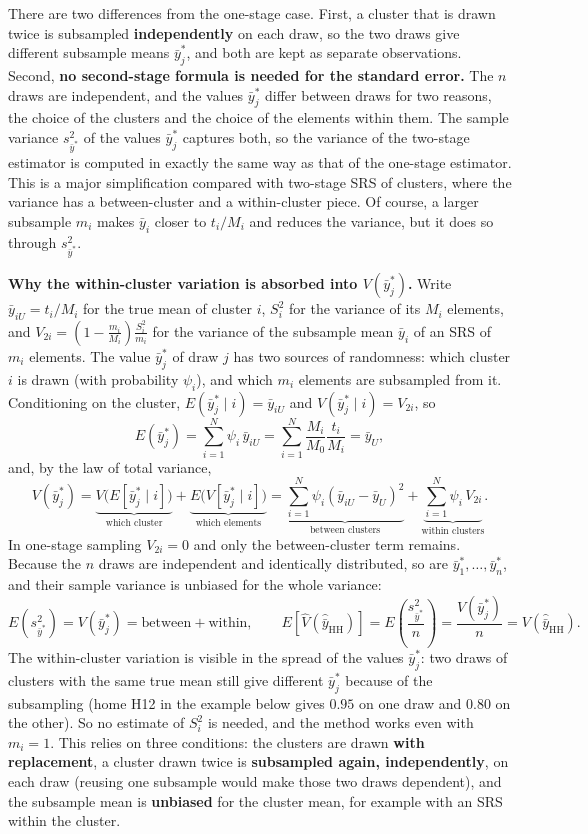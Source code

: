 \documentclass[
  letterpaper,
  DIV=11,
  numbers=noendperiod]{scrreprt}
\renewcommand{\[}{\begin{equation}}
\renewcommand{\]}{\end{equation}}
\begin{document}
There are two differences from the one-stage case. First, a cluster that
is drawn twice is subsampled \textbf{independently} on each draw, so the
two draws give different subsample means \(\bar{y}_j^*\), and both are
kept as separate observations. Second, \textbf{no second-stage formula
is needed for the standard error.} The \(n\) draws are independent, and
the values \(\bar{y}_j^*\) differ between draws for two reasons, the
choice of the clusters and the choice of the elements within them. The
sample variance \(s_{\bar{y}^*}^2\) of the values \(\bar{y}_j^*\)
captures both, so the variance of the two-stage estimator is computed in
exactly the same way as that of the one-stage estimator. This is a major
simplification compared with two-stage SRS of clusters, where the
variance has a between-cluster and a within-cluster piece. Of course, a
larger subsample \(m_i\) makes \(\bar{y}_i\) closer to \(t_i/M_i\) and
reduces the variance, but it does so through \(s_{\bar{y}^*}^2\).

\textbf{Why the within-cluster variation is absorbed into
\(V(\bar{y}_j^*)\).} Write \(\bar{y}_{iU}=t_i/M_i\) for the true mean of
cluster \(i\), \(S_i^2\) for the variance of its \(M_i\) elements, and
\(V_{2i}=\left(1-\frac{m_i}{M_i}\right)\frac{S_i^2}{m_i}\) for the
variance of the subsample mean \(\bar{y}_i\) of an SRS of \(m_i\)
elements. The value \(\bar{y}_j^*\) of draw \(j\) has two sources of
randomness: which cluster \(i\) is drawn (with probability \(\psi_i\)),
and which \(m_i\) elements are subsampled from it. Conditioning on the
cluster, \(E(\bar{y}_j^*\mid i)=\bar{y}_{iU}\) and
\(V(\bar{y}_j^*\mid i)=V_{2i}\), so \[
E(\bar{y}_j^*)=\sum_{i=1}^N\psi_i\,\bar{y}_{iU}=\sum_{i=1}^N\frac{M_i}{M_0}\frac{t_i}{M_i}=\bar{y}_U,
\] and, by the law of total variance, \[
V(\bar{y}_j^*)=\underbrace{V\big(E[\bar{y}_j^*\mid i]\big)}_{\text{which cluster}}
+\underbrace{E\big(V[\bar{y}_j^*\mid i]\big)}_{\text{which elements}}
=\underbrace{\sum_{i=1}^N\psi_i\left(\bar{y}_{iU}-\bar{y}_U\right)^2}_{\text{between clusters}}
+\underbrace{\sum_{i=1}^N\psi_i\,V_{2i}}_{\text{within clusters}} .
\] In one-stage sampling \(V_{2i}=0\) and only the between-cluster term
remains. Because the \(n\) draws are independent and identically
distributed, so are \(\bar{y}_1^*,\dots,\bar{y}_n^*\), and their sample
variance is unbiased for the whole variance: \[
E\left(s_{\bar{y}^*}^2\right)=V(\bar{y}_j^*)=\text{between}+\text{within},\qquad
E\left[\widehat{V}(\hat{\bar{y}}_{\mathrm{HH}})\right]=E\left(\frac{s_{\bar{y}^*}^2}{n}\right)=\frac{V(\bar{y}_j^*)}{n}=V(\hat{\bar{y}}_{\mathrm{HH}}).
\] The within-cluster variation is visible in the spread of the values
\(\bar{y}_j^*\): two draws of clusters with the same true mean still
give different \(\bar{y}_j^*\) because of the subsampling (home H12 in
the example below gives \(0.95\) on one draw and \(0.80\) on the other).
So no estimate of \(S_i^2\) is needed, and the method works even with
\(m_i=1\). This relies on three conditions: the clusters are drawn
\textbf{with replacement}, a cluster drawn twice is \textbf{subsampled
again, independently}, on each draw (reusing one subsample would make
those two draws dependent), and the subsample mean is \textbf{unbiased}
for the cluster mean, for example with an SRS within the cluster.
\end{document}
